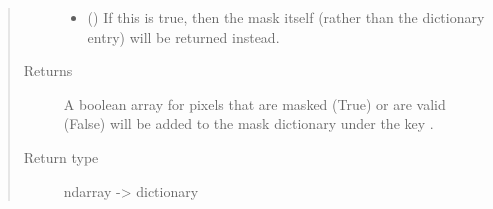 \documentclass[letterpaper,10pt,english]{sphinxmanual}
\begin{document}
\begin{fulllineitems}
\begin{quote}
\begin{description}
\begin{itemize}
\item {} 
 (\sphinxstyleliteralemphasis{\sphinxupquote{ (}}\sphinxstyleliteralemphasis{\sphinxupquote{)}}) \textendash{} If this is true, then the mask itself (rather than the dictionary entry) will be
returned instead.

\end{itemize}

\item[{Returns}] \leavevmode
{} \textendash{} A boolean array for pixels that are masked (True) or are valid (False) will be added to
the mask dictionary under the key .

\item[{Return type}] \leavevmode
ndarray -\textgreater{} dictionary

\end{description}\end{quote}

\end{fulllineitems}

\end{document}
